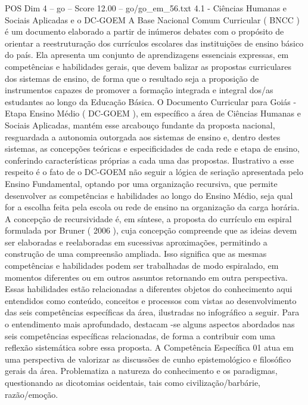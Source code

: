 \begin{textsample}{POS Dim 4 – go – Score 12.00 – go/go\_em\_56.txt}  \label{ex:f4_pos_070}
4.1 - Ciências Humanas e Sociais Aplicadas e o DC-GOEM A Base Nacional Comum Curricular ( BNCC ) é um documento elaborado a partir de inúmeros debates com o propósito de orientar a reestruturação dos currículos escolares das instituições de ensino básico do país.
Ela apresenta um conjunto de aprendizagens essenciais expressas, em competências e habilidades gerais, que devem balizar as propostas curriculares dos sistemas de ensino, de forma que o resultado seja a proposição de instrumentos capazes de promover a formação integrada e integral dos/as estudantes ao longo da Educação Básica.
O Documento Curricular para Goiás - Etapa Ensino Médio ( DC-GOEM ), em específico a área de Ciências Humanas e Sociais Aplicadas, mantém esse arcabouço fundante da proposta nacional, resguardada a autonomia outorgada aos sistemas de ensino e, dentro destes sistemas, as concepções teóricas e especificidades de cada rede e etapa de ensino, conferindo características próprias a cada uma das propostas.
Ilustrativo a esse respeito é o fato de o DC-GOEM não seguir a lógica de seriação apresentada pelo Ensino Fundamental, optando por uma organização recursiva, que permite desenvolver as competências e habilidades ao longo do Ensino Médio, seja qual for a escolha feita pela escola ou rede de ensino na organização da carga horária.
A concepção de recursividade é, em síntese, a proposta do currículo em espiral formulada por Bruner ( 2006 ), cuja concepção compreende que as ideias devem ser elaboradas e reelaboradas em sucessivas aproximações, permitindo a construção de uma compreensão ampliada.
Isso significa que as mesmas competências e habilidades podem ser trabalhadas de modo espiralado, em momentos diferentes ou em outros assuntos retornando em outra perspectiva.
Essas habilidades estão relacionadas a diferentes objetos do conhecimento aqui entendidos como conteúdo, conceitos e processos com vistas ao desenvolvimento das seis competências específicas da área, ilustradas no infográfico a seguir.
Para o entendimento mais aprofundado, destacam -se alguns aspectos abordados nas seis competências específicas relacionadas, de forma a contribuir com uma reflexão sistemática sobre essa proposta.
A Competência Específica 01 atua em uma perspectiva de valorizar as discussões de cunho epistemológico e filosófico gerais da área.
Problematiza a natureza do conhecimento e os paradigmas, questionando as dicotomias ocidentais, tais como civilização/barbárie, razão/emoção.

\end{textsample}
